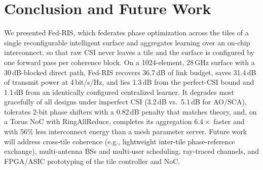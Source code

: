 \documentclass[conference]{IEEEtran}
\newcommand{\fedris}{Fed-RIS}
\newcommand{\dB}{\,dB\xspace}
\begin{document}
\section{Conclusion and Future Work}
\label{sec:conclusion}

We presented \fedris{}, which federates phase optimization across the tiles of a single reconfigurable intelligent surface and aggregates learning over an on-chip interconnect, so that raw CSI never leaves a tile and the surface is configured by one forward pass per coherence block. On a 1024-element, 28\,GHz surface with a 30\dB-blocked direct path, \fedris{} recovers 36.7\dB of link budget, saves 31.4\dB of transmit power at 4\,bit/s/Hz, and lies 1.3\dB from the perfect-CSI bound and 1.1\dB from an identically configured centralized learner. It degrades most gracefully of all designs under imperfect CSI (3.2\dB vs.\ 5.1\dB for AO/SCA), tolerates 2-bit phase shifters with a 0.82\dB penalty that matches theory, and, on a Torus NoC with RingAllReduce, completes its aggregation $6.4\times$ faster and with 56\% less interconnect energy than a mesh parameter server. Future work will address cross-tile coherence (e.g., lightweight inter-tile phase-reference exchange), multi-antenna BSs and multi-user scheduling, ray-traced channels, and FPGA/ASIC prototyping of the tile controller and NoC.
\end{document}
